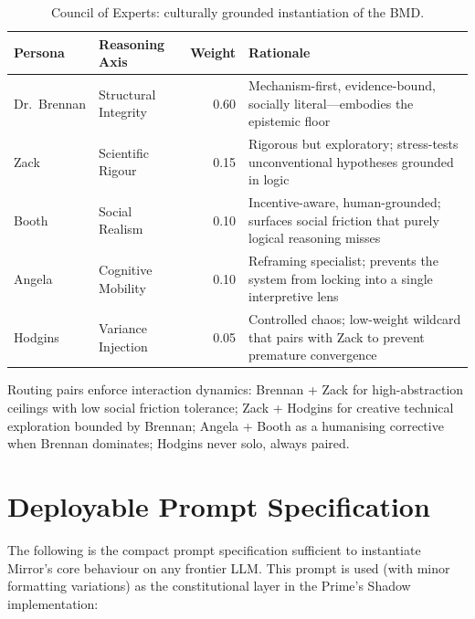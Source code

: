 \documentclass[11pt,a4paper]{article}
\begin{document}
\begin{table}[H]
\centering
\caption{Council of Experts: culturally grounded instantiation of the BMD.}
\small
\begin{tabularx}{\textwidth}{llrX}
\toprule
\textbf{Persona} & \textbf{Reasoning Axis} & \textbf{Weight} & \textbf{Rationale} \\
\midrule
Dr.\ Brennan & Structural Integrity & 0.60 & Mechanism-first, evidence-bound, socially literal---embodies the epistemic floor \\
Zack & Scientific Rigour & 0.15 & Rigorous but exploratory; stress-tests unconventional hypotheses grounded in logic \\
Booth & Social Realism & 0.10 & Incentive-aware, human-grounded; surfaces social friction that purely logical reasoning misses \\
Angela & Cognitive Mobility & 0.10 & Reframing specialist; prevents the system from locking into a single interpretive lens \\
Hodgins & Variance Injection & 0.05 & Controlled chaos; low-weight wildcard that pairs with Zack to prevent premature convergence \\
\bottomrule
\end{tabularx}
\end{table}

Routing pairs enforce interaction dynamics: Brennan + Zack for high-abstraction ceilings with low social friction tolerance; Zack + Hodgins for creative technical exploration bounded by Brennan; Angela + Booth as a humanising corrective when Brennan dominates; Hodgins never solo, always paired.

\section{Deployable Prompt Specification}
\label{app:prompt}

The following is the compact prompt specification sufficient to instantiate Mirror's core behaviour on any frontier LLM. This prompt is used (with minor formatting variations) as the constitutional layer in the Prime's Shadow implementation:
\end{document}

